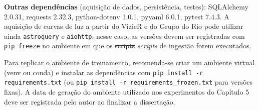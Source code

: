 \documentclass[msc]{on} %
\makeatletter
\providecommand{\DIFaddtex}[1]{{\protect\color{red}#1}} %
\providecommand{\DIFdeltex}[1]{{\protect\color{red}\sout{#1}}} %
\providecommand{\DIFaddbegin}{} %
\providecommand{\DIFaddend}{} %
\providecommand{\DIFdelbegin}{} %
\providecommand{\DIFdelend}{} %
\providecommand{\DIFadd}[1]{\texorpdfstring{\DIFaddtex{#1}}{#1}} %
\providecommand{\DIFdel}[1]{\texorpdfstring{\DIFdeltex{#1}}{}} %
\let\sout@orig\sout %
\renewcommand{\sout}[1]{\ifmmode\text{\sout@orig{\ensuremath{#1}}}\else\sout@orig{#1}\fi} %
\makeatother
\begin{document}
\textbf{Outras dependências} (aquisição de dados, persistência, testes): SQLAlchemy 2.0.31, requests 2.32.3, python-dotenv 1.0.1, pyyaml 6.0.1, pytest 7.4.3. A aquisição de curvas de luz a partir do VizieR e do Grupo do Rio pode utilizar ainda \texttt{astroquery} e \texttt{aiohttp}; nesse caso, as versões devem ser registradas com \texttt{pip freeze} no ambiente em que os \DIFdelbegin \DIFdel{scripts }\DIFdelend \DIFaddbegin \textit{\DIFadd{scripts}} \DIFaddend de ingestão forem executados.

Para replicar o ambiente de treinamento, recomenda-se criar um ambiente virtual (venv ou conda) e instalar as dependências com \texttt{pip install -r requirements.txt} (ou \texttt{pip install -r requirements\_frozen.txt} para versões fixas). A data de geração do ambiente utilizado nos experimentos do Capítulo 5 deve ser registrada pelo autor ao finalizar a dissertação.
\end{document}
